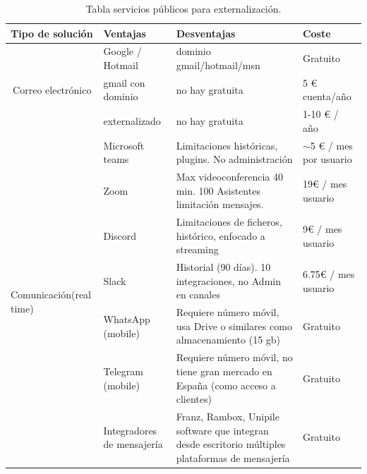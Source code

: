 \begin{center}
\label{T:externalización}
\begin{longtable}[!ht]{|p{3.25cm}|p{3.25cm}|p{3.25cm}|p{3.25cm}|}
\caption{Tabla servicios públicos para externalización.}  
\\ \hline
\textbf{Tipo de solución} & \textbf{Ventajas} & \textbf{Desventajas} & \textbf{Coste} \\ \hline
\hline
\multicolumn{1}{|c|}{\multirow{3}{*}{Correo electrónico}} &
  Google / Hotmail &
  dominio gmail/hotmail/msn &
  Gratuito \\ \cline{2-4} 
\multicolumn{1}{|p{3.25cm}|}{} &
  \multicolumn{1}{p{3.25cm}|}{gmail con dominio} &
  \multicolumn{1}{p{3.25cm}|}{no hay gratuita} &
  \multicolumn{1}{p{3.25cm}|}{5 € cuenta/año} \\ \cline{2-4} 
\multicolumn{1}{|p{3.25cm}|}{} &
  \multicolumn{1}{p{3.25cm}|}{externalizado} &
  \multicolumn{1}{p{3.25cm}|}{no hay gratuita} &
  \multicolumn{1}{p{3.25cm}|}{1-10 € / año} \\ \hline
  
\multicolumn{1}{|p{3.25cm}|}{\multirow{7}{4em}{Comunicación(real time)}} &
  \multicolumn{1}{p{3.25cm}|}{Microsoft teams} &
  \multicolumn{1}{p{3.25cm}|}{Limitaciones históricas, plugins. No administración} &
  \multicolumn{1}{p{3.25cm}|}{$\sim$5 € / mes por usuario} \\ \cline{2-4} 
\multicolumn{1}{|p{3.25cm}|}{} &
  \multicolumn{1}{p{3.25cm}|}{Zoom} &
  \multicolumn{1}{p{3.25cm}|}{Max videoconferencia 40 min. 100 Asistentes limitación mensajes.} &
  \multicolumn{1}{p{3.25cm}|}{19€ / mes usuario} \\ \cline{2-4} 
\multicolumn{1}{|p{3.25cm}|}{} &
  \multicolumn{1}{p{3.25cm}|}{Discord} &
  \multicolumn{1}{p{3.25cm}|}{Limitaciones de ficheros, histórico, enfocado a streaming} &
  \multicolumn{1}{p{3.25cm}|}{9€ / mes usuario} \\ \cline{2-4} 
\multicolumn{1}{|p{3.25cm}|}{} &
  \multicolumn{1}{p{3.25cm}|}{Slack} &
  \multicolumn{1}{p{3.25cm}|}{Historial (90 días). 10 integraciones, no Admin en canales} &
  \multicolumn{1}{p{3.25cm}|}{6.75€ / mes usuario} \\ \cline{2-4} 
\multicolumn{1}{|p{3.25cm}|}{} &
  \multicolumn{1}{p{3.25cm}|}{WhatsApp (mobile)} &
  \multicolumn{1}{p{3.25cm}|}{Requiere número móvil, usa Drive o similares como almacenamiento (15 gb)} & 
  \multicolumn{1}{p{3.25cm}|}{Gratuito} \\ \cline{2-4} 
\multicolumn{1}{|p{3.25cm}|}{} &
  \multicolumn{1}{p{3.25cm}|}{Telegram (mobile)} &
  \multicolumn{1}{p{3.25cm}|}{Requiere número móvil, no tiene gran mercado en España (como acceso a clientes)} &
  \multicolumn{1}{p{3.25cm}|}{Gratuito} \\ \cline{2-4} 
\multicolumn{1}{|p{3.25cm}|}{} &
  \multicolumn{1}{p{3.25cm}|}{Integradores de mensajería} &
  \multicolumn{1}{p{3.25cm}|}{Franz\cite{c_franz}, Rambox, Unipile software que integran desde escritorio múltiples plataformas de mensajería} &
  \multicolumn{1}{p{3.25cm}|}{Gratuito} \\ \hline
  

\end{longtable}
\end{center}
